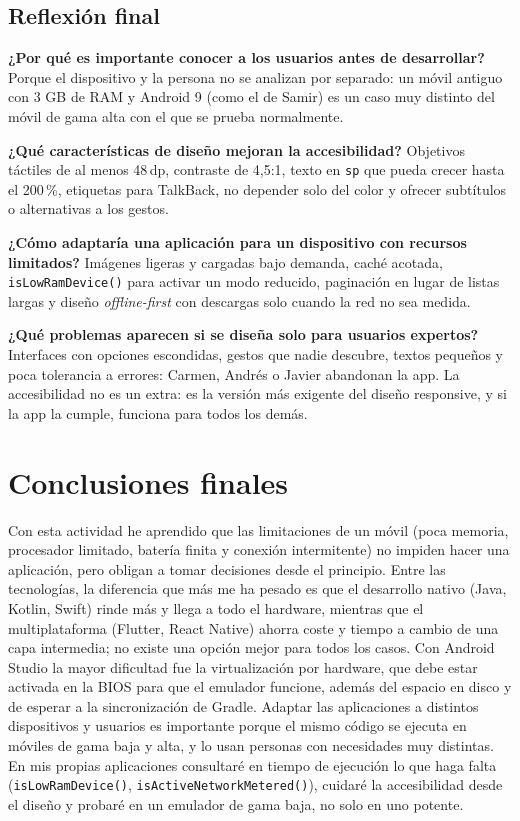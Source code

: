 \documentclass[11pt,a4paper]{article}
\newcommand{\code}[1]{\texttt{\color{navylight}#1}}
\newcommand{\campo}[1]{\textbf{\color{navy}#1}}
\begin{document}
	\subsection{Reflexión final}

	\campo{¿Por qué es importante conocer a los usuarios antes de desarrollar?} Porque el dispositivo y la persona no se analizan por separado: un móvil antiguo con 3 GB de RAM y Android 9 (como el de Samir) es un caso muy distinto del móvil de gama alta con el que se prueba normalmente.

	\campo{¿Qué características de diseño mejoran la accesibilidad?} Objetivos táctiles de al menos 48\,dp, contraste de 4,5:1, texto en \code{sp} que pueda crecer hasta el 200\,\%, etiquetas para TalkBack, no depender solo del color y ofrecer subtítulos o alternativas a los gestos.

	\campo{¿Cómo adaptaría una aplicación para un dispositivo con recursos limitados?} Imágenes ligeras y cargadas bajo demanda, caché acotada, \code{isLowRamDevice()} para activar un modo reducido, paginación en lugar de listas largas y diseño \emph{offline-first} con descargas solo cuando la red no sea medida.

	\campo{¿Qué problemas aparecen si se diseña solo para usuarios expertos?} Interfaces con opciones escondidas, gestos que nadie descubre, textos pequeños y poca tolerancia a errores: Carmen, Andrés o Javier abandonan la app. La accesibilidad no es un extra: es la versión más exigente del diseño responsive, y si la app la cumple, funciona para todos los demás.

	\section*{Conclusiones finales}
	
	Con esta actividad he aprendido que las limitaciones de un móvil (poca memoria, procesador limitado, batería finita y conexión intermitente) no impiden hacer una aplicación, pero obligan a tomar decisiones desde el principio. Entre las tecnologías, la diferencia que más me ha pesado es que el desarrollo nativo (Java, Kotlin, Swift) rinde más y llega a todo el hardware, mientras que el multiplataforma (Flutter, React Native) ahorra coste y tiempo a cambio de una capa intermedia; no existe una opción mejor para todos los casos. Con Android Studio la mayor dificultad fue la virtualización por hardware, que debe estar activada en la BIOS para que el emulador funcione, además del espacio en disco y de esperar a la sincronización de Gradle. Adaptar las aplicaciones a distintos dispositivos y usuarios es importante porque el mismo código se ejecuta en móviles de gama baja y alta, y lo usan personas con necesidades muy distintas. En mis propias aplicaciones consultaré en tiempo de ejecución lo que haga falta (\code{isLowRamDevice()}, \code{isActiveNetworkMetered()}), cuidaré la accesibilidad desde el diseño y probaré en un emulador de gama baja, no solo en uno potente.
\end{document}
